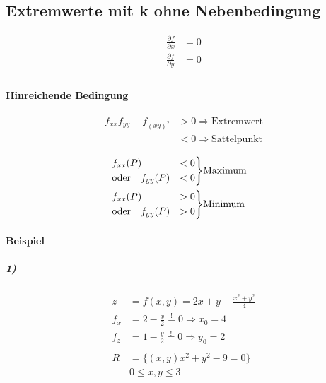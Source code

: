 \subsection{Extremwerte mit k ohne Nebenbedingung}

\begin{align*}
    \frac{\partial f}{\partial x} &= 0 \\
    \frac{\partial f}{\partial y} &= 0 \\
\end{align*}

\paragraph{Hinreichende Bedingung}


\begin{align*}
    f_{xx} f_{yy} - f_{{(xy)}^2} &> 0 \Rightarrow \text{Extremwert} \\
    &< 0 \Rightarrow \text{Sattelpunkt}
\end{align*}

\begin{align*}
    \begin{rcases}
        f_{xx} (P) &< 0 \\
        \text{oder}\quad f_{yy} (P) &< 0
    \end{rcases}
    &\text{Maximum} \\
    \begin{rcases}
        f_{xx} (P) &> 0 \\
        \text{oder}\quad f_{yy} (P) &> 0
    \end{rcases}
    &\text{Minimum}
\end{align*}

\paragraph{Beispiel}

\subparagraph{1)}

\begin{align*}
    z &= f(x, y) = 2x + y - \frac{x^2 + y^2}{4} \\
    f_x &= 2 - \frac{x}{2} \overset{!}{=} 0 \Rightarrow x_0 = 4 \\
    f_z &= 1 - \frac{y}{2} \overset{!}{=} 0 \Rightarrow y_0 = 2 \\
    \\
    R &= \{ (x, y) x^2 + y^2 - 9 = 0 \} \\
    & 0 \leq x, y \leq 3
\end{align*}

